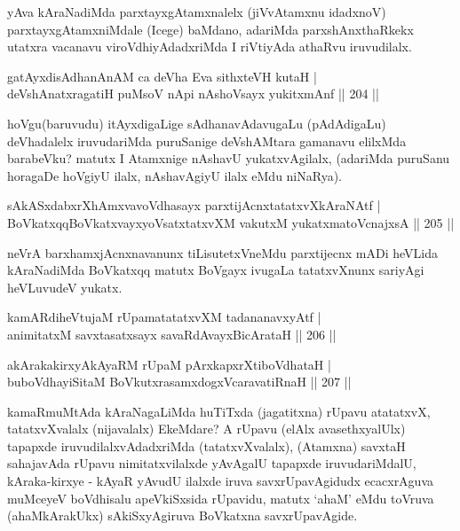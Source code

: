 \begin{artha}
yAva kAraNadiMda parxtayxgAtamxnalelx (jiVvAtamxnu idadxnoV) parxtayxgAtamxniMdale (Icege) baMdano, adariMda parxshAnxthaRkekx utatxra vacanavu viroVdhiyAdadxriMda I riVtiyAda athaRvu iruvudilalx.
\end{artha}

\begin{shl}
gatAyxdisAdhanAnAM ca deVha Eva sithxteVH kutaH |\\
deVshAnatxragatiH puMsoV nApi nAshoV\s sayx yukitxmAnf \hfill || 204 ||
\end{shl}

\begin{artha}
hoVgu(baruvudu) itAyxdigaLige sAdhanavAdavugaLu (pAdAdigaLu) deVhadalelx iruvudariMda puruSanige deVshAMtara gamanavu elilxMda barabeVku? matutx I Atamxnige nAshavU yukatxvAgilalx, (adariMda puruSanu horagaDe hoVgiyU ilalx, nAshavAgiyU ilalx eMdu niNaRya).
\end{artha}


\begin{shl}
sAkASxdabxrXhAmxvavoVdhasayx parxtijAcnxtatatxvXkAraNAtf |\\
BoVkatxqqBoVkatxvayxyoVsatxtatxvXM vakutxM yukatxmatoV\s cnajxsA \hfill || 205 ||
\end{shl}

\begin{artha}
neVrA barxhamxjAcnxnavanunx tiLisutetxVneMdu parxtijecnx mADi heVLida kAraNadiMda BoVkatxqq matutx BoVgayx ivugaLa tatatxvXnunx sariyAgi heVLuvudeV yukatx.
\end{artha}


\begin{shl}
kamARdiheVtujaM rUpamatatatxvXM tadananavxyAtf |\\
animitatxM savxtasatxsayx savaRdA\s vayxBicArataH \hfill || 206 ||
\end{shl}

\begin{shl}
akArakakirxyAkAyaRM rUpaM pArxkapxrXtiboVdhataH |\\
buboVdhayiSitaM BoVkutxrasamxdogxVcaravatiRnaH \hfill || 207 ||
\end{shl}

\begin{artha}
kamaRmuMtAda kAraNagaLiMda huTiTxda (jagatitxna) rUpavu atatatxvX, tatatxvXvalalx (nijavalalx) EkeMdare? A rUpavu (elAlx avasethxyalUlx)  tapapxde iruvudilalxvAdadxriMda (tatatxvXvalalx), (Atamxna) savxtaH sahajavAda rUpavu nimitatxvilalxde yAvAgalU tapapxde iruvudariMdalU, kAraka-kirxye - kAyaR yAvudU ilalxde iruva savxrUpavAgidudx ecacxrAguva muMceyeV boVdhisalu apeVkiSxsida rUpavidu, matutx `ahaM' eMdu toVruva (ahaMkArakUkx) sAkiSxyAgiruva BoVkatxna savxrUpavAgide.
\end{artha}

